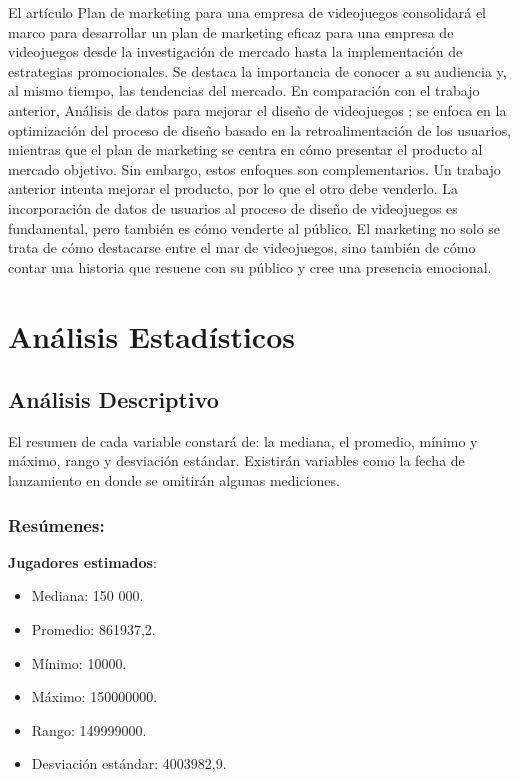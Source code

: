 \documentclass[
  letterpaper,
  DIV=11,
  numbers=noendperiod]{scrreprt}
\begin{document}
El artículo Plan de marketing para una empresa de videojuegos
consolidará el marco para desarrollar un plan de marketing eficaz para
una empresa de videojuegos desde la investigación de mercado hasta la
implementación de estrategias promocionales. Se destaca la importancia
de conocer a su audiencia y, al mismo tiempo, las tendencias del
mercado. En comparación con el trabajo anterior, Análisis de datos para
mejorar el diseño de videojuegos ; se enfoca en la optimización del
proceso de diseño basado en la retroalimentación de los usuarios,
mientras que el plan de marketing se centra en cómo presentar el
producto al mercado objetivo. Sin embargo, estos enfoques son
complementarios. Un trabajo anterior intenta mejorar el producto, por lo
que el otro debe venderlo. La incorporación de datos de usuarios al
proceso de diseño de videojuegos es fundamental, pero también es cómo
venderte al público. El marketing no solo se trata de cómo destacarse
entre el mar de videojuegos, sino también de cómo contar una historia
que resuene con su público y cree una presencia emocional.


\hypertarget{anuxe1lisis-estaduxedsticos}{%
\chapter{Análisis Estadísticos}\label{anuxe1lisis-estaduxedsticos}}

\hypertarget{anuxe1lisis-descriptivo}{%
\section{Análisis Descriptivo}\label{anuxe1lisis-descriptivo}}

El resumen de cada variable constará de: la mediana, el promedio, mínimo
y máximo, rango y desviación estándar. Existirán variables como la fecha
de lanzamiento en donde se omitirán algunas mediciones.

\hypertarget{resuxfamenes}{%
\subsection{Resúmenes:}\label{resuxfamenes}}

\begin{tcolorbox}[enhanced jigsaw, colback=white, colframe=quarto-callout-color-frame, arc=.35mm, rightrule=.15mm, toprule=.15mm, left=2mm, bottomrule=.15mm, breakable, leftrule=.75mm, opacityback=0]

\textbf{Jugadores estimados}:

\begin{itemize}
\item
  Mediana: 150 000.
\item
  Promedio: 861937,2.
\item
  Mínimo: 10000.
\item
  Máximo: 150000000.
\item
  Rango: 149999000.
\item
  Desviación estándar: 4003982,9.
\end{itemize}

\end{tcolorbox}
\end{document}
